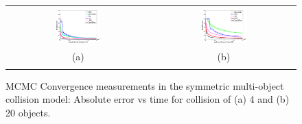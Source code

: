 \documentclass{article} %
\newcommand{\nnn}{0.33}
\newcommand{\nnh}{0.23}
\begin{document}
\begin{figure}[t!]
\vspace{-0mm}
\begin{center}
\begin{tabular}{cc}
   \hspace{-5mm} \includegraphics[width=\nnn\textwidth, height=\nnh\textwidth]{plotsx/collisionx/err-vs-time__param5-shaded.pdf} 
& \hspace{-3mm} \includegraphics[width=\nnn\textwidth, height=\nnh\textwidth]{plotsx/collisionx/err-vs-time__param15-shaded.pdf} 
\vspace{-1.5mm}
\\
\hspace{-5mm} \footnotesize(a) 
& \hspace{-4mm} \footnotesize(b) 
\\
\multicolumn{2}{c}{}
\end{tabular}
\end{center}
\vspace{-6mm}
\caption{\footnotesize 
MCMC Convergence measurements in the symmetric multi-object collision model: 
Absolute error vs time for collision of (a) 4 and (b) 20 objects.}
\label{fig:multi-object.mom}
\vspace{-2mm}
\end{figure}
\end{document}
